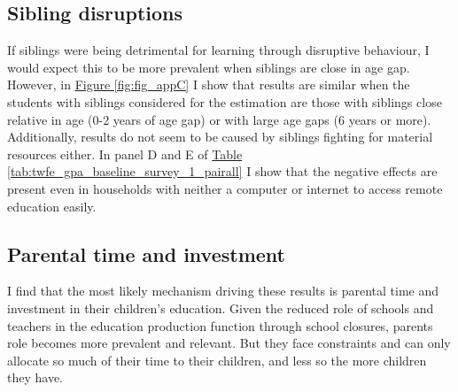 \subsection{Sibling disruptions}

If siblings were being detrimental for learning through disruptive behaviour, I would expect this to be more prevalent when siblings are close in age gap. However, in \hyperref[fig:fig_appC]{Figure \ref{fig:fig_appC}} I show that results are similar when the students with siblings considered for the estimation are those with siblings close relative in age (0-2 years of age gap) or with large age gaps (6 years or more). Additionally, results do not seem to be caused by siblings fighting for material resources either. In panel D and E of \hyperref[tab:twfe_gpa_baseline_survey_1_pairall]{Table \ref{tab:twfe_gpa_baseline_survey_1_pairall}} I show that the negative effects are present even in households with neither a computer or internet to access remote education easily.





\subsection{Parental time and investment}

I find that the most likely mechanism driving these results is parental time and investment in their children's education. Given the reduced role of schools and teachers in the education production function through school closures, parents role becomes more prevalent and relevant. But they face constraints and can only allocate so much of their time to their children, and less so the more children they have.

